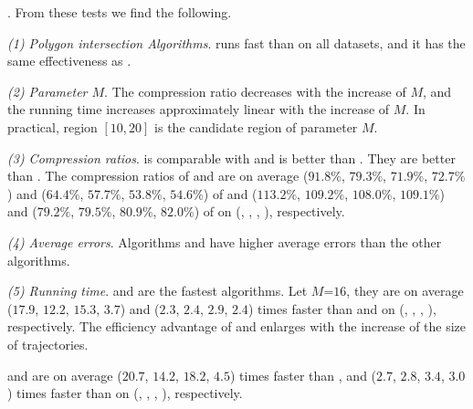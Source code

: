 .
From these tests we find the following.

\ni\emph{(1) Polygon intersection Algorithms}. \rpia runs fast than \cpia on all datasets, and it has the same effectiveness as \cpia.

\ni\emph{(2) Parameter $M$}. The compression ratio decreases with the increase of $M$, and the running time increases approximately linear with the increase of $M$. In practical, region $[10, 20]$ is the candidate region of parameter $M$.

\ni\emph{(3) Compression ratios}. \cist is comparable with \dps and \cista is better than \dps.
They are better than \squishe.
The compression ratios of \cist and \cista are on average ($91.8\%$, $79.3\%$, $71.9\%$, {$72.7\%$}) and ($64.4\%$, $57.7\%$, $53.8\%$, {$54.6\%$}) of \squishe and ($113.2\%$, $109.2\%$, $108.0\%$, $109.1\%$) and ($79.2\%$, $79.5\%$, $80.9\%$, $82.0\%$) of \dps on (\truck, \sercar, \geolife, \pricar), respectively.


\ni\emph{(4) Average errors}. {Algorithms \cist and \cista have higher average errors than the other algorithms.}

\ni\emph{(5) Running time}. \cist and \cista are the fastest algorithms. Let \textcolor[rgb]{0.00,0.07,1.00}{$M$=$16$}, they are on average \textcolor[rgb]{1.00,0.50,0.50}{($17.9$, $12.2$, $15.3$, $3.7$) and ($2.3$, $2.4$, $2.9$, {$2.4$})} times faster than \dps and \squishe on (\truck, \sercar, \geolife, \pricar), respectively.
The efficiency advantage of \cist and \cista enlarges with the increase of the size of trajectories.


\cist and \cista are on average ($20.7$, $14.2$, $18.2$, \textcolor[rgb]{1.00,0.50,0.25}{{$4.5$}}) times faster than \dps, and ($2.7$, $2.8$, $3.4$, {$3.0$}) times faster than \squishe on (\truck, \sercar, {\geolife}, \pricar), respectively.



